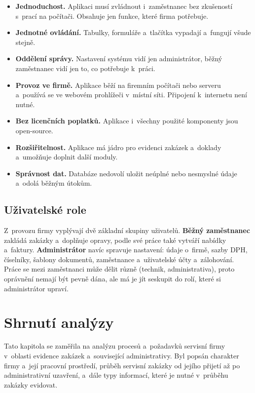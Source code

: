 \begin{itemize}
\item \textbf{Jednoduchost.} Aplikaci musí zvládnout i~zaměstnanec bez zkušeností s~prací na počítači. Obsahuje jen funkce, které firma potřebuje.
\item \textbf{Jednotné ovládání.} Tabulky, formuláře a~tlačítka vypadají a~fungují všude stejně.
\item \textbf{Oddělení správy.} Nastavení systému vidí jen administrátor, běžný zaměstnanec vidí jen to, co potřebuje k~práci.
\item \textbf{Provoz ve firmě.} Aplikace běží na firemním počítači nebo serveru a~používá se ve webovém prohlížeči v~místní síti. Připojení k~internetu není nutné.
\item \textbf{Bez licenčních poplatků.} Aplikace i~všechny použité komponenty jsou open-source.
\item \textbf{Rozšiřitelnost.} Aplikace má jádro pro evidenci zakázek a~doklady a~umožňuje doplnit další moduly.
\item \textbf{Správnost dat.} Databáze nedovolí uložit neúplné nebo nesmyslné údaje a~odolá běžným útokům.
\end{itemize}

\subsection{Uživatelské role}

Z~provozu firmy vyplývají dvě základní skupiny uživatelů. \textbf{Běžný zaměstnanec} zakládá zakázky a~doplňuje opravy, podle své práce také vytváří nabídky a~faktury. \textbf{Administrátor} navíc spravuje nastavení: údaje o~firmě, sazby DPH, číselníky, šablony dokumentů, zaměstnance a~uživatelské účty a~zálohování. Práce se mezi zaměstnanci může dělit různě (technik, administrativa), proto oprávnění nemají být pevně dána, ale má je jít seskupit do rolí, které si administrátor upraví.

\section{Shrnutí analýzy}

Tato kapitola se zaměřila na analýzu procesů a~požadavků servisní firmy v~oblasti evidence zakázek a~související administrativy. Byl popsán charakter firmy a~její pracovní prostředí, průběh servisní zakázky od jejího přijetí až po administrativní uzavření, a~dále typy informací, které je nutné v~průběhu zakázky evidovat.

